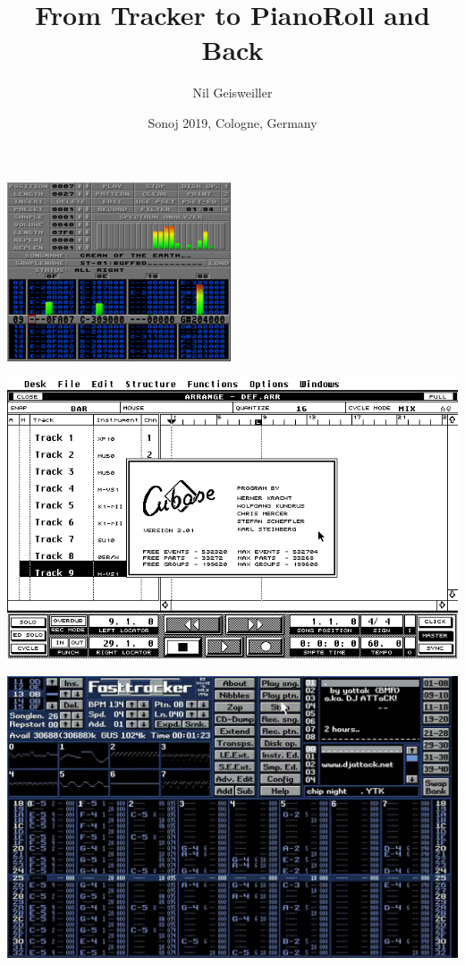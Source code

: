 \documentclass{beamer}
\title{From Tracker to PianoRoll and Back}
\author{Nil Geisweiller}
\date[Sonoj-19]
{Sonoj 2019, Cologne, Germany}
\begin{document}
\begin{frame}
  \maketitle
\end{frame}

\begin{frame}
  \begin{center}
    \includegraphics[scale=1.0]{images/protracker.png}
  \end{center}
\end{frame}

\begin{frame}
  \begin{center}
    \includegraphics[scale=0.5]{images/cubase_2-01_atari_st.png}
  \end{center}
\end{frame}

\begin{frame}
  \begin{center}
    \includegraphics[scale=0.3]{images/fasttracker2.jpg}
  \end{center}
\end{frame}
\end{document}
